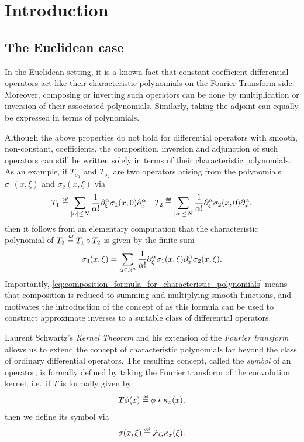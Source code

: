 \chapter{Introduction}

\section{The Euclidean case}

In the Euclidean setting,
it is a known fact that constant-coefficient differential operators act like their characteristic polynomials on the Fourier Transform side.
Moreover, composing or inverting such operators can be done by multiplication or inversion of their associated polynomials.
Similarly, taking the adjoint can equally be expressed in terms of polynomials.

Although the above properties do not hold for differential operators with smooth, non-constant, coefficients,
the composition, inversion and adjunction of such operators can still be written solely in terms of their characteristic polynomials.
As an example,
if $T_{\sigma_1}$ and $T_{\sigma_2}$ are two operators arising from the polynomials $\sigma_1(x, \xi)$ and $\sigma_2(x, \xi)$ via
\begin{align*}
    T_1 \defeq \sum_{\abs \alpha \leq N} \frac 1 {\alpha!} \iD{\xi^\alpha} \sigma_1(x, 0) \iD{x^\alpha}
    \quad
    T_2 \defeq \sum_{\abs \alpha \leq N} \frac 1 {\alpha!} \iD{\xi^\alpha} \sigma_2(x, 0) \iD{x^\alpha},
\end{align*}
then it follows from an elementary computation
that the characteristic polynomial of $T_3 \defeq T_1 \circ T_2$ is given by the finite sum
\begin{align}
    \sigma_3(x, \xi) = \sum_{\alpha \in \N^n} \frac 1 {\alpha!} \iD{\xi^\alpha} \sigma_1(x, \xi) \iD{x^\alpha} \sigma_2(x, \xi)
    \label{eq:composition_formula_for_characteristic_polynomials}.
\end{align}
Importantly,
\eqref{eq:composition_formula_for_characteristic_polynomials} means that
composition is reduced to summing and multiplying smooth functions,
and motivates the introduction of the concept of 
as this formula can be used to construct approximate inverses to a suitable class of differential operators.

Laurent Schwartz's \emph{Kernel Theorem} and his extension of the \emph{Fourier transform} allows us to extend the concept of characteristic polynomials far beyond the class of ordinary differential operators.
The resulting concept, called the \emph{symbol} of an operator,
is formally defined by taking the Fourier transform of the convolution kernel,
i.e.\ if $T$ is formally given by
\begin{align*}
    T \phi(x) \defeq \conv \phi {\kappa_x}(x),
\end{align*}
then we define its symbol via
\begin{align*}
    \sigma(x, \xi) \defeq \Fourier \kappa_x(\xi).
\end{align*}

